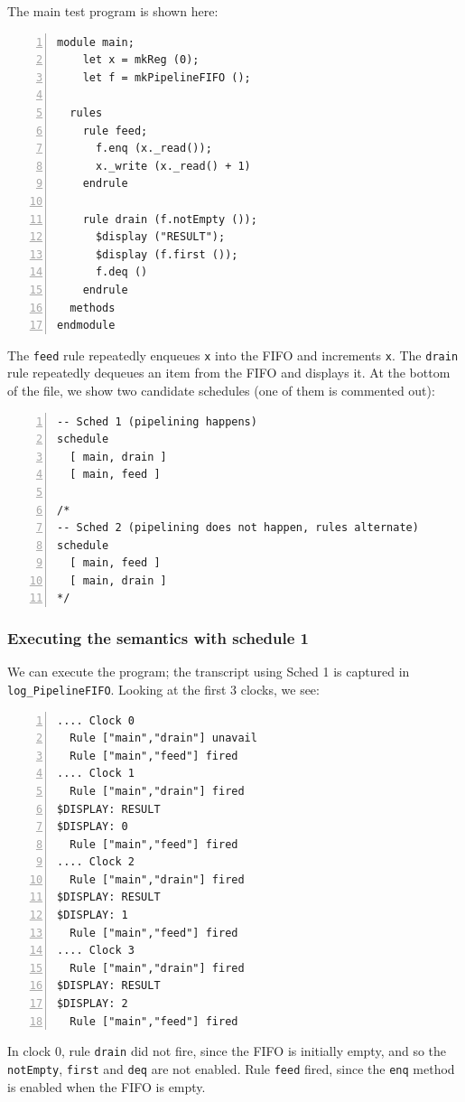 \documentclass[11pt]{article}
\newcommand{\term}[1]{\texttt{#1}}
\begin{document}
The main test program is shown here:

\begin{Verbatim}[frame=single, numbers=left, commandchars=\\\{\}]
module main;
    let x = mkReg (0);
    let f = mkPipelineFIFO ();

  rules
    rule feed;
      f.enq (x._read());
      x._write (x._read() + 1)
    endrule

    rule drain (f.notEmpty ());
      $display ("RESULT");
      $display (f.first ());
      f.deq ()
    endrule
  methods
endmodule
\end{Verbatim}

The \term{feed} rule repeatedly enqueues \term{x} into the FIFO and increments \term{x}.
The \term{drain} rule repeatedly dequeues an item from the FIFO and displays it.
At the bottom of the file, we show two candidate schedules (one of them is commented out):

\begin{Verbatim}[frame=single, numbers=left, commandchars=\\\{\}]
-- Sched 1 (pipelining happens)
schedule
  [ main, drain ]
  [ main, feed ]

/*
-- Sched 2 (pipelining does not happen, rules alternate)
schedule
  [ main, feed ]
  [ main, drain ]
*/
\end{Verbatim}


\subsubsection{Executing the semantics with schedule 1}

We can execute the program; the transcript using Sched 1 is captured
in \verb|log_PipelineFIFO|.  Looking at the first 3 clocks, we see:

\begin{Verbatim}[frame=single, numbers=left, commandchars=\\\{\}]
.... Clock 0
  Rule ["main","drain"] unavail
  Rule ["main","feed"] fired
.... Clock 1
  Rule ["main","drain"] fired
$DISPLAY: RESULT
$DISPLAY: 0
  Rule ["main","feed"] fired
.... Clock 2
  Rule ["main","drain"] fired
$DISPLAY: RESULT
$DISPLAY: 1
  Rule ["main","feed"] fired
.... Clock 3
  Rule ["main","drain"] fired
$DISPLAY: RESULT
$DISPLAY: 2
  Rule ["main","feed"] fired
\end{Verbatim}

In clock 0, rule \term{drain} did not fire, since the FIFO is
initially empty, and so the \term{notEmpty}, \term{first} and
\term{deq} are not enabled. Rule \term{feed} fired, since the
\term{enq} method is enabled when the FIFO is empty.
\end{document}

